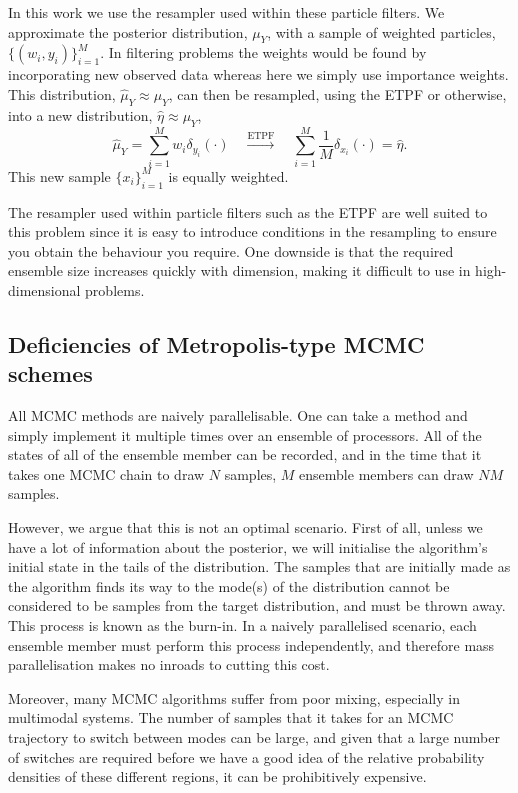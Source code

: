 \documentclass[final]{siamltex}
\begin{document}
In this work we use the resampler used within these particle filters. We
approximate the posterior distribution, $\mu_Y$, with a sample
of weighted particles, $\{(w_i,y_i)\}_{i=1}^M$. In filtering problems
the weights would be found by incorporating new observed data whereas
here we simply use importance weights. This distribution, $\hat{\mu}_Y
\approx \mu_Y$, can then be resampled, using the ETPF or otherwise,
into a new distribution, $\hat{\eta} \approx \mu_Y$,
\begin{equation}\label{eqn:resampler}
	\hat{\mu}_Y = \sum\limits_{i=1}^M \! w_i\delta_{y_i}(\cdot)
	 \quad \xrightarrow{\text{ETPF}} \quad \sum\limits_{i=1}^M \!
	 \frac{1}{M} \delta_{x_i}(\cdot) = \hat{\eta}.
\end{equation}This
new sample $\{x_i\}_{i=1}^M$ is equally weighted.

The resampler used within particle filters such as the ETPF are well suited to this problem
since it is easy to introduce conditions in the resampling to ensure
you obtain the behaviour you require. One downside is that the
required ensemble size increases quickly with dimension, making it
difficult to use in high-dimensional problems.


\subsection{Deficiencies of Metropolis-type MCMC schemes}
All MCMC methods are naively parallelisable. One can take a method
and simply implement it multiple times over an ensemble of processors. All
of the states of all of the ensemble member can be recorded, and in the time
that it takes one MCMC chain to draw $N$ samples, $M$ ensemble members
can draw $NM$ samples. 

However, we argue that this is not an optimal
scenario. First of all, unless we have a lot of information about the
posterior, we will initialise the algorithm's initial state in the
tails of the distribution. The samples that are initially made as the
algorithm finds its way to the mode(s) of the distribution cannot be
considered to be samples from the target distribution, and must be thrown
away. This process is known as the burn-in. In a naively parallelised
scenario, each ensemble member must perform this process independently,
and therefore mass parallelisation makes no inroads to cutting this cost.

Moreover, many MCMC algorithms suffer from poor mixing, especially in
multimodal systems. The number of samples that it takes for an MCMC
trajectory to switch between modes can be large, and given that a large
number of switches are required before we have a good idea of the relative
probability densities of these different regions, it can be prohibitively
expensive.
\end{document}
